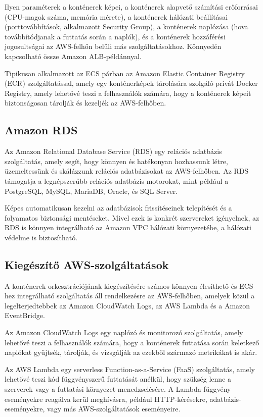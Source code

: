 Ilyen paraméterek a konténerek képei, a konténerek alapvető számítási erőforrásai (CPU-magok száma, memória mérete), a konténerek hálózati beállításai (porttovábbítások, alkalmazott Security Group), a konténerek naplózása (hova továbbítódjanak a futtatás során a naplók), és a konténerek hozzáférési jogosultságai az AWS-felhőn belüli más szolgáltatásokhoz. Könnyedén kapcsolható össze Amazon ALB-példánnyal.

Tipikusan alkalmazott az ECS párban az Amazon Elastic Container Registry (ECR) szolgáltatással, amely egy konténerképek tárolására szolgáló privát Docker Registry, amely lehetővé teszi a felhasználók számára, hogy a konténerek képeit biztonságosan tárolják és kezeljék az AWS-felhőben.

\subsection{Amazon RDS}

Az Amazon Relational Database Service (RDS) egy relációs adatbázis szolgáltatás, amely segít, hogy könnyen és hatékonyan hozhassunk létre, üzemeltessünk és skálázzunk relációs adatbázisokat az AWS-felhőben. Az RDS támogatja a legnépszerűbb relációs adatbázis motorokat, mint például a PostgreSQL, MySQL, MariaDB, Oracle, és SQL Server.

Képes automatikusan kezelni az adatbázisok frissítéseinek telepítését és a folyamatos biztonsági mentéseket. Mivel ezek is konkrét szervereket igényelnek, az RDS is könnyen integrálható az Amazon VPC hálózati környezetébe, a hálózati védelme is biztosítható.

\subsection{Kiegészítő AWS-szolgáltatások}

A konténerek orkesztrációjának kiegészítésére számos könnyen élesíthető és ECS-hez integrálható szolgáltatás áll rendelkezésre az AWS-felhőben, amelyek közül a legelterjedtebbek az Amazon CloudWatch Logs, az AWS Lambda és a Amazon EventBridge.

Az Amazon CloudWatch Logs egy naplózó és monitorozó szolgáltatás, amely lehetővé teszi a felhasználók számára, hogy a konténerek futtatása során keletkező naplókat gyűjtsék, tárolják, és vizsgálják az ezekből származó metrikákat is akár.

Az AWS Lambda egy serverless Function-as-a-Service (FaaS) szolgáltatás, amely lehetővé teszi kód függvényszerű futtatását anélkül, hogy szükség lenne a szerverek vagy a futtatási környezet menedzselésére. A Lambda-függvény eseményekre reagálva kerül meghívásra, például HTTP-kérésekre, adatbázis-eseményekre, vagy más AWS-szolgáltatások eseményeire.

